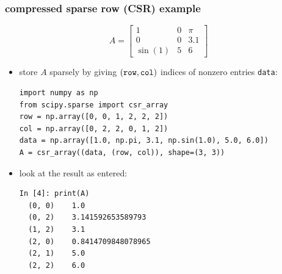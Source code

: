 \documentclass[10pt,
               svgnames,
               hyperref={colorlinks,citecolor=DeepPink4,linkcolor=FireBrick,urlcolor=Maroon},
               usepdftitle=false]{beamer}
\begin{document}
\begin{frame}[fragile]
\frametitle{compressed sparse row (CSR) example}

$$A = \begin{bmatrix} 1 & 0 & \pi \\ 0 & 0 & 3.1 \\ \sin(1) & 5 & 6 \end{bmatrix}$$

\begin{itemize}
\item store $A$ sparsely by giving $(\text{\texttt{row}},\text{\texttt{col}})$ indices of nonzero entries \texttt{data}:

\begin{center}
\begin{minipage}{0.85\textwidth}
\begin{verbatim}
import numpy as np
from scipy.sparse import csr_array
row = np.array([0, 0, 1, 2, 2, 2])
col = np.array([0, 2, 2, 0, 1, 2])
data = np.array([1.0, np.pi, 3.1, np.sin(1.0), 5.0, 6.0])
A = csr_array((data, (row, col)), shape=(3, 3))
\end{verbatim}
\end{minipage}
\end{center}

\bigskip
\item look at the result as entered:
\begin{center}
\begin{minipage}{0.8\textwidth}
\begin{verbatim}
In [4]: print(A)
  (0, 0)	1.0
  (0, 2)	3.141592653589793
  (1, 2)	3.1
  (2, 0)	0.8414709848078965
  (2, 1)	5.0
  (2, 2)	6.0
\end{verbatim}
\end{minipage}
\end{center}
\end{itemize}
\end{frame}
\end{document}
